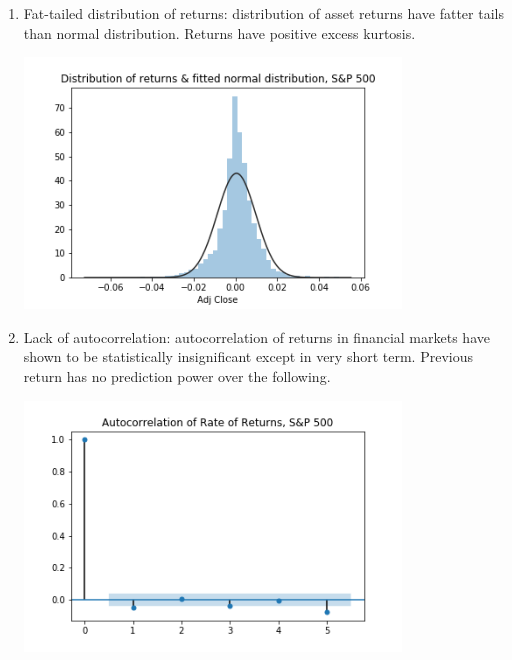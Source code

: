 \begin{enumerate}
    \item Fat-tailed distribution of returns: distribution of asset returns have fatter tails than normal distribution. Returns have positive excess kurtosis. 
    \par
    \begin{minipage}{\linewidth}
        \centering
        \includegraphics[width=10cm]{plots/S&P500_fat_tails.png}
    \end{minipage}

    \item Lack of autocorrelation: autocorrelation of returns in financial markets have shown to be statistically insignificant except in very short term. Previous return has no prediction power over the following. 
    \par
    \begin{minipage}{\linewidth}
        \centering
        \includegraphics[width=10cm]{plots/S&P500_autocorr.png}
    \end{minipage}


\end{enumerate}
